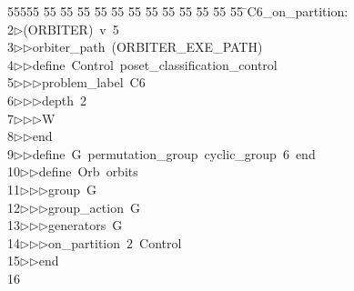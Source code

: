 %
%
\begin{tabbing}
55555 \= 55 \= 55 \= 55 \= 55 \= 55 \= 55 \= 55 \= 55 \= 55 \= 55 \= 55 \= 55 \= \>C6\_on\_partition:\\[0pt]
2\>$\triangleright$\>(ORBITER)\ v\ 5\ \\[0pt]
3\>$\triangleright$\>$\triangleright$\>orbiter\_path\ (ORBITER\_EXE\_PATH)\ \\[0pt]
4\>$\triangleright$\>$\triangleright$\>define\ Control\ poset\_classification\_control\ \\[0pt]
5\>$\triangleright$\>$\triangleright$\>$\triangleright$\>problem\_label\ C6\ \\[0pt]
6\>$\triangleright$\>$\triangleright$\>$\triangleright$\>depth\ 2\ \\[0pt]
7\>$\triangleright$\>$\triangleright$\>$\triangleright$\>W\ \\[0pt]
8\>$\triangleright$\>$\triangleright$\>end\ \\[0pt]
9\>$\triangleright$\>$\triangleright$\>define\ G\ permutation\_group\ cyclic\_group\ 6\ end\ \\[0pt]
10\>$\triangleright$\>$\triangleright$\>define\ Orb\ orbits\ \\[0pt]
11\>$\triangleright$\>$\triangleright$\>$\triangleright$\>group\ G\ \\[0pt]
12\>$\triangleright$\>$\triangleright$\>$\triangleright$\>group\_action\ G\ \\[0pt]
13\>$\triangleright$\>$\triangleright$\>$\triangleright$\>generators\ G\ \\[0pt]
14\>$\triangleright$\>$\triangleright$\>$\triangleright$\>on\_partition\ 2\ Control\ \\[0pt]
15\>$\triangleright$\>$\triangleright$\>end\\[0pt]
16\>\end{tabbing}
